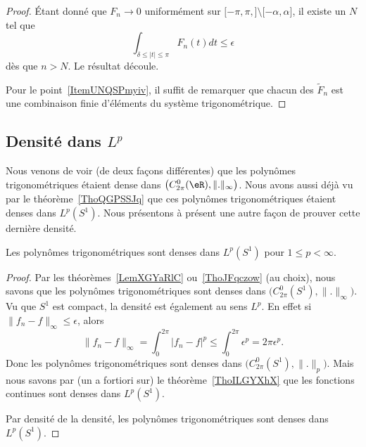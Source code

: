 \begin{proof}
    Étant donné que \( F_n\to 0\) uniformément sur \( \mathopen[ -\pi,\pi ,  \mathclose]\setminus\mathopen[ -\alpha , \alpha \mathclose]\), il existe un \( N\) tel que
    \begin{equation}
        \int_{\delta\leq| t |\leq \pi}F_n(t)dt\leq \epsilon
    \end{equation}
    dès que \( n>N\). Le résultat découle.

    Pour le point~\ref{ItemUNQSPmyiv}, il suffit de remarquer que chacun des \( \tilde F_n\) est une combinaison finie d'éléments du système trigonométrique.
\end{proof}

\subsection{Densité dans \texorpdfstring{$ L^p$}{Lp}}

Nous venons de voir (de deux façons différentes) que les polynômes trigonométriques étaient dense dans \( \big( C^0_{2\pi}(\eR),\| . \|_{\infty} \big)\). Nous avons aussi déjà vu par le théorème~\ref{ThoQGPSSJq} que ces polynômes trigonométriques étaient denses dans \( L^p(S^1)\). Nous présentons à présent une autre façon de prouver cette dernière densité.

\begin{theorem}     \label{ThoDPTwimI}
    Les polynômes trigonométriques sont denses dans \( L^p(S^1)\) pour \( 1\leq p <\infty\).
\end{theorem}

\begin{proof}
    Par les théorèmes~\ref{LemXGYaRlC} ou~\ref{ThoJFqczow} (au choix), nous savons que les polynômes trigonométriques sont denses dans \( \big( C^0_{2\pi}(S^1),\| . \|_{\infty} \big)\). Vu que \( S^1\) est compact, la densité est également au sens \( L^p\). En effet si \( \| f_n-f \|_{\infty}\leq \epsilon\), alors
    \begin{equation}
        \| f_n-f \|_{\infty}=\int_0^{2\pi}| f_n-f |^p\leq\int_0^{2\pi}\epsilon^p=2\pi\epsilon^p.
    \end{equation}
    Donc les polynômes trigonométriques sont denses dans \( \big( C^0_{2\pi}(S^1),\| . \|_p \big)\). Mais nous savons par (un a fortiori sur) le théorème~\ref{ThoILGYXhX} que les fonctions continues sont denses dans \( L^p(S^1)\).

    Par densité de la densité, les polynômes trigonométriques sont denses dans \( L^p(S^1)\).
\end{proof}

